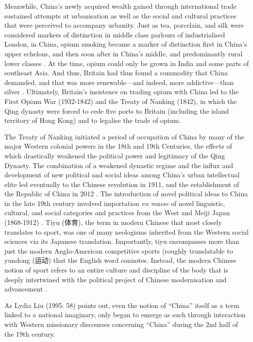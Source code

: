 Meanwhile, China's newly acquired wealth gained through international trade sustained  attempts at urbanisation as well as the social and cultural practices that were perceived to accompany urbanity.  Just as tea, porcelain, and silk were considered markers of distinction in middle class parlours of industrialised London, in China, opium smoking became a marker of distinction first in China's upper echelons, and then soon after in China's middle, and predominantly rural lower classes \citep{Zheng2005}.  At the time, opium could only be grown in India and some parts of southeast Asia. And thus, Britain had thus found a commodity that China demanded, and that was more renewable---and indeed, more addictive---than silver \citep{Fay2005}.  Ultimately, Britain's insistence on trading opium with China led to the First Opium War (1932-1842) and the Treaty of Nanking (1842), in which the Qing dynasty were forced to cede five ports to Britain (including the island territory of Hong Kong) and to legalise the trade of opium.

The Treaty of Nanking initiated a period of occupation of China by many of the major Western colonial powers in the 18th and 19th Centuries, the effects of which drastically weakened the political power and legitimacy of the Qing Dynasty. The combination of a weakened dynastic regime and the influx and development of new political and social ideas among China's urban intellectual elite led eventually to the Chinese revolution in 1911, and the establishment of the Republic of China in 2012 \citep{Mitter2008}.  The introduction of novel political ideas to China in the late 19th century involved importation \textit{en masse} of novel linguistic, cultural, and social categories and practices from the West and Meiji Japan (1868-1912) \citep{Liu1995}. Tiyu (体育), the term in modern Chinese that most closely translates to sport, was one of many neologisms inherited from the Western social sciences via its Japanese translation.  Importantly,  tiyu encompasses more than just the modern Anglo-American competitive sports (roughly translatable to yundong (运动) that the English word connotes.  Instead, the modern Chinese notion of sport refers to an entire culture and discipline of the body that is deeply intertwined with the political project of Chinese modernisation and advancement \citep{Morris2004}.

    As Lydia Liu (1995: 58) points out, even the notion of “China” itself as a term linked to a national imaginary, only began to emerge as such through interaction with Western missionary discourses concerning “China” during the 2nd half of the 19th century.

